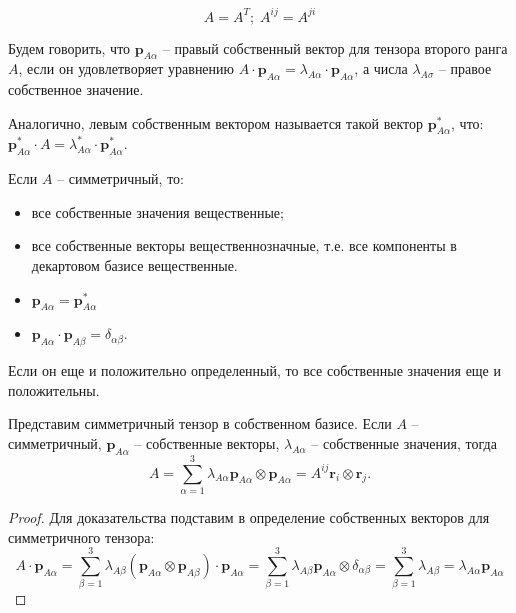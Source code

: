 
\begin{definition}
	\begin{equation*}
		A=A^T;\;A^{ij}=A^{ji}
	\end{equation*}
\end{definition}

\begin{definition}
	Будем говорить, что $\mathbf{p}_{A\alpha}$ -- правый собственный вектор для тензора второго ранга $A$, если
	он удовлетворяет уравнению $A \cdot \mathbf{p}_{A\alpha} = \lambda_{A\alpha} \cdot \mathbf{p}_{A\alpha}$, а числа $\lambda_{A\sigma}$ -- правое собственное значение.
	
	Аналогично, левым собственным вектором называется такой вектор $\mathbf{p}^*_{A\alpha}$, что:
	$\mathbf{p}^*_{A\alpha} \cdot A = \lambda^*_{A\alpha} \cdot \mathbf{p}^*_{A\alpha}$.
\end{definition}

\begin{corollary}
	Если $A$ -- симметричный, то:
	\begin{itemize}
		\item все собственные значения вещественные;
		\item все собственные векторы вещественнозначные, т.е. все компоненты в декартовом базисе
		вещественные.
		\item $\mathbf{p}_{A\alpha} = \mathbf{p}^*_{A\alpha}$
		\item $\mathbf{p}_{A\alpha} \cdot \mathbf{p}_{A\beta} = \delta_{\alpha\beta}.$
	\end{itemize}
	
	Если он еще и положительно определенный, то все собственные значения еще и положительны.
\end{corollary}
\begin{corollary}
	Представим симметричный тензор в собственном базисе. Если $A$ -- симметричный,
	$\mathbf{p}_{A\alpha}$ -- собственные векторы, $\lambda_{A\alpha}$ -- собственные значения,
	тогда
	\[
	A = \sum_{\alpha=1}^3 \lambda_{A\alpha} \mathbf{p}_{A\alpha} \otimes \mathbf{p}_{A\alpha}
	= A^{ij} \mathbf{r}_i \otimes \mathbf{r}_j.
	\]
	\begin{proof}
		Для доказательства подставим в определение собственных векторов для симметричного тензора:
		\[
		A \cdot \mathbf{p}_{A\alpha}
		= \sum_{\beta=1}^3 \lambda_{A\beta} (\mathbf{p}_{A\alpha}\otimes \mathbf{p}_{A\beta}) \cdot \mathbf{p}_{A\alpha}
		= \sum_{\beta=1}^3 \lambda_{A\beta} \mathbf{p}_{A\alpha} \otimes \delta_{\alpha\beta}
		= \sum_{\beta=1}^3 \lambda_{A\beta} 
		= \lambda_{A\alpha} \mathbf{p}_{A\alpha}
		\]
	\end{proof}
\end{corollary}

